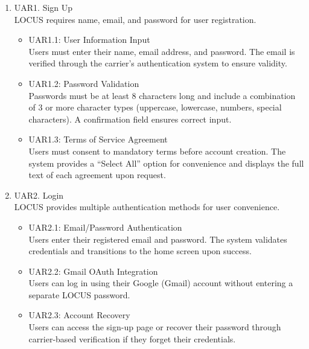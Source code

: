\documentclass[conference]{IEEEtran}
\begin{document}
\begin{enumerate}
    \item [1)] UAR1. Sign Up \\
    LOCUS requires name, email, and password for user registration.
    \begin{itemize}
        \item UAR1.1: User Information Input \\
        Users must enter their name, email address, and password. The email is verified through the carrier's authentication system to ensure validity.

        \item UAR1.2: Password Validation \\
        Passwords must be at least 8 characters long and include a combination of 3 or more character types (uppercase, lowercase, numbers, special characters). A confirmation field ensures correct input.

        \item UAR1.3: Terms of Service Agreement \\
        Users must consent to mandatory terms before account creation. The system provides a ``Select All'' option for convenience and displays the full text of each agreement upon request.
    \end{itemize}

    \item [2)] UAR2. Login \\
    LOCUS provides multiple authentication methods for user convenience.
    \begin{itemize}
        \item UAR2.1: Email/Password Authentication \\
        Users enter their registered email and password. The system validates credentials and transitions to the home screen upon success.

        \item UAR2.2: Gmail OAuth Integration \\
        Users can log in using their Google (Gmail) account without entering a separate LOCUS password.

        \item UAR2.3: Account Recovery \\
        Users can access the sign-up page or recover their password through carrier-based verification if they forget their credentials.
    \end{itemize}


\end{enumerate}
\end{document}
